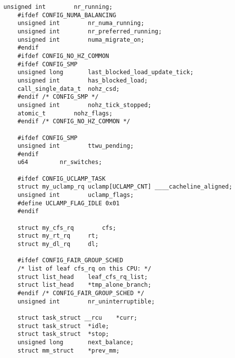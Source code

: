 \begin{lstlisting}[label=lst:all_code,caption=Загружаемый модуль ядра]
	unsigned int		nr_running;
	#ifdef CONFIG_NUMA_BALANCING
	unsigned int		nr_numa_running;
	unsigned int		nr_preferred_running;
	unsigned int		numa_migrate_on;
	#endif
	#ifdef CONFIG_NO_HZ_COMMON
	#ifdef CONFIG_SMP
	unsigned long		last_blocked_load_update_tick;
	unsigned int		has_blocked_load;
	call_single_data_t	nohz_csd;
	#endif /* CONFIG_SMP */
	unsigned int		nohz_tick_stopped;
	atomic_t		nohz_flags;
	#endif /* CONFIG_NO_HZ_COMMON */
	
	#ifdef CONFIG_SMP
	unsigned int		ttwu_pending;
	#endif
	u64			nr_switches;
	
	#ifdef CONFIG_UCLAMP_TASK
	struct my_uclamp_rq	uclamp[UCLAMP_CNT] ____cacheline_aligned;
	unsigned int		uclamp_flags;
	#define UCLAMP_FLAG_IDLE 0x01
	#endif
	
	struct my_cfs_rq		cfs;
	struct my_rt_rq		rt;
	struct my_dl_rq		dl;
	
	#ifdef CONFIG_FAIR_GROUP_SCHED
	/* list of leaf cfs_rq on this CPU: */
	struct list_head	leaf_cfs_rq_list;
	struct list_head	*tmp_alone_branch;
	#endif /* CONFIG_FAIR_GROUP_SCHED */
	unsigned int		nr_uninterruptible;
	
	struct task_struct __rcu	*curr;
	struct task_struct	*idle;
	struct task_struct	*stop;
	unsigned long		next_balance;
	struct mm_struct	*prev_mm;
	

\end{lstlisting}
